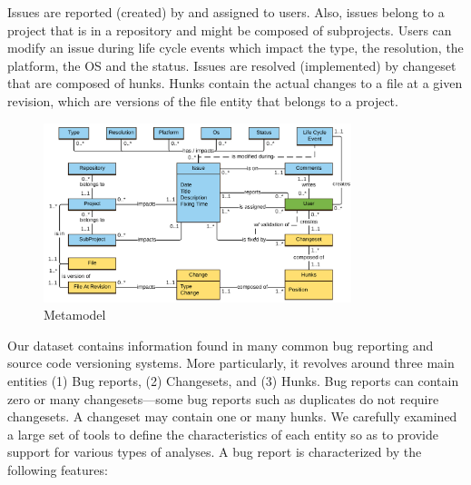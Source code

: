 \documentclass{sig-alternate-05-2015}
\begin{document}
Issues are reported (created) by and assigned to users.
Also, issues belong to a project that is in a repository and might be composed
of subprojects.
Users can modify an issue during life cycle events which impact the type,
the resolution, the platform, the OS and the status.
Issues are resolved (implemented) by changeset that are composed of hunks.
Hunks contain the actual changes to a file at a given revision,
which are versions of the file entity that belongs to a project.


\begin{figure}
  \centering
  \includegraphics[width=0.8\textwidth]{media/Bumper-Model.png}
  \caption{Metamodel\label{fig:bumper-metamodel}}
\end{figure}

Our dataset contains information found
in many common bug reporting and source code versioning
systems. More particularly, it revolves
around three main entities (1) Bug reports, (2) Changesets,
and (3) Hunks. Bug reports can contain zero or many
changesets---some bug reports such as duplicates do not
require changesets. A changeset may contain one or many
hunks. We carefully examined a large set of tools to define
the characteristics of each entity so as to provide support
for various types of analyses.
A bug report is characterized by the following features:
\end{document}

